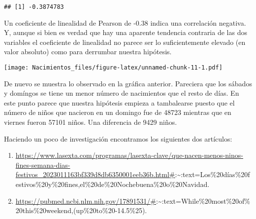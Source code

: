 \documentclass[
]{article}
\newenvironment{Shaded}{\begin{snugshade}}{\end{snugshade}}
\newcommand{\AttributeTok}[1]{\textcolor[rgb]{0.77,0.63,0.00}{#1}}
\newcommand{\ControlFlowTok}[1]{\textcolor[rgb]{0.13,0.29,0.53}{\textbf{#1}}}
\newcommand{\DecValTok}[1]{\textcolor[rgb]{0.00,0.00,0.81}{#1}}
\newcommand{\FunctionTok}[1]{\textcolor[rgb]{0.00,0.00,0.00}{#1}}
\newcommand{\NormalTok}[1]{#1}
\newcommand{\OtherTok}[1]{\textcolor[rgb]{0.56,0.35,0.01}{#1}}
\newcommand{\SpecialCharTok}[1]{\textcolor[rgb]{0.00,0.00,0.00}{#1}}
\newcommand{\StringTok}[1]{\textcolor[rgb]{0.31,0.60,0.02}{#1}}
\providecommand{\tightlist}{%
  \setlength{\itemsep}{0pt}\setlength{\parskip}{0pt}}
\begin{document}
\begin{verbatim}
## [1] -0.3874783
\end{verbatim}

Un coeficiente de linealidad de Pearson de -0.38 indica una correlación
negativa. Y, aunque si bien es verdad que hay una aparente tendencia
contraria de las dos variables el coeficiente de linealidad no parece
ser lo suficientemente elevado (en valor absoluto) como para derrumbar
nuestra hipótesis.

\begin{Shaded}
\end{Shaded}

\texttt{[image: Nacimientos\_files/figure-latex/unnamed-chunk-11-1.pdf]}

De nuevo se muestra lo observado en la gráfica anterior. Pareciera que
los sábados y domíngos se tiene un menor número de nacimientos que el
resto de días. En este punto parece que nuestra hipótesis empieza a
tambalearse puesto que el número de niños que nacieron en un domingo fue
de 48723 mientras que en viernes fueron 57101 niños. Una diferencia de
9429 niños.

Haciendo un poco de investigación encontramos los siguientes dos
artículos:

\begin{enumerate}
\def\labelenumi{\arabic{enumi}.}
\tightlist
\item
  \url{https://www.lasexta.com/programas/lasexta-clave/que-nacen-menos-ninos-fines-semana-dias-festivos_2023011163bf339d8db6350001eeb36b.html\#}:\textasciitilde:text=Los\%20días\%20festivos\%20y\%20fines,el\%20de\%20Nochebuena\%20o\%20Navidad.
\item
  \url{https://pubmed.ncbi.nlm.nih.gov/17891531/\#}:\textasciitilde:text=While\%20most\%20of\%20this\%20weekend,(up\%20to\%20-14.5\%25).
\end{enumerate}
\end{document}
